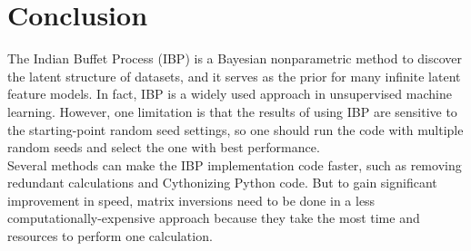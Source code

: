 \section{Conclusion}
The Indian Buffet Process (IBP) is a Bayesian nonparametric method to discover the latent structure of datasets, and it serves as the prior for many infinite latent feature models. In fact, IBP is a widely used approach in unsupervised machine learning. However, one limitation is that the results of using IBP are sensitive to the starting-point random seed settings, so one should run the code with multiple random seeds and select the one with best performance.\\

Several methods can make the IBP implementation code faster, such as removing redundant calculations and Cythonizing Python code. But to gain significant improvement in speed, matrix inversions need to be done in a less computationally-expensive approach because they take the most time and resources to perform one calculation. 